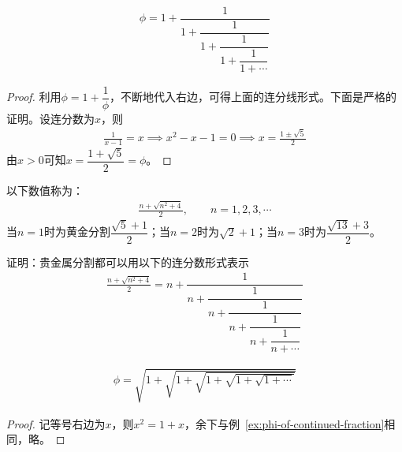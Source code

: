 \begin{example}[连分数表示]\label{ex:phi-of-continued-fraction}
  \begin{align}
    \phi = 1 + \dfrac1{1 + \dfrac1{1+\dfrac1{1+\dfrac1{1+\cdots}}}}
  \end{align}
\end{example}
\begin{proof}
  利用$\phi=1+\dfrac1\phi$，不断地代入右边，可得上面的连分线形式。下面是严格的证明。设连分数为$x$，则
  \begin{align*}
    \frac1{x-1}=x\implies x^2-x-1=0\implies x=\frac{1\pm\sqrt5}2
  \end{align*}
  由$x>0$可知$x=\dfrac{1+\sqrt5}2=\phi$。
\end{proof}

\begin{definition}
  以下数值称为：
  \begin{align}
    \frac{n+\sqrt{n^2+4}}2,\quad\quad n=1,2,3,\cdots
  \end{align}
  当$n=1$时为黄金分割$\dfrac{\sqrt5+1}2$；当$n=2$时为$\sqrt2+1$；当$n=3$时为$\dfrac{\sqrt{13}+3}2$。
\end{definition}
\begin{question}
  证明：贵金属分割都可以用以下的连分数形式表示
  \begin{align*}
    \frac{n+\sqrt{n^2+4}}2=
    n+\dfrac1{n+\dfrac1{n+\dfrac1{n+\dfrac1{n+\dfrac1{n+\cdots}}}}}
  \end{align*}
\end{question}

\begin{example}[平方根表示]
  \begin{align}
    \phi=\sqrt{1+\sqrt{1+\sqrt{1+\sqrt{1+\sqrt{1+\cdots}}}}}
  \end{align}
\end{example}
\begin{proof}
  记等号右边为$x$，则$x^2 = 1 + x$，余下与例~\ref{ex:phi-of-continued-fraction}相同，略。
\end{proof}

